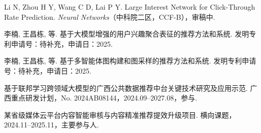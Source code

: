 
\begin{achievements}

\begin{theachievements}[已投稿论文]
  \item Li N, Zhou H Y, Wang C D, Lai P Y. Large Interest Network for Click-Through Rate Prediction. \textit{Neural Networks}（中科院二区，CCF-B），审稿中.
\end{theachievements}

\begin{theachievements}[发明专利]
  \item 李楠, 王昌栋, 等. 基于大模型增强的用户兴趣聚合表征的推荐方法和系统. 发明专利申请号：待补充，申请日：2025.
  \item 李楠, 王昌栋, 等. 基于多智能体图构建和图采样的推荐方法和系统. 发明专利申请号：待补充，申请日：2025.
\end{theachievements}

\begin{theachievements}[参与的科研项目]
  \item 基于联邦学习跨领域大模型的广西公共数据推荐中台关键技术研究及应用示范. 广西重点研发计划，No. 2024AB08144，2024.09--2027.08，参与.
  \item 某省级媒体云平台内容智能审核与内容精准推荐提效升级项目. 横向课题，2024.11--2025.11，主要参与人.
\end{theachievements}

\end{achievements}

